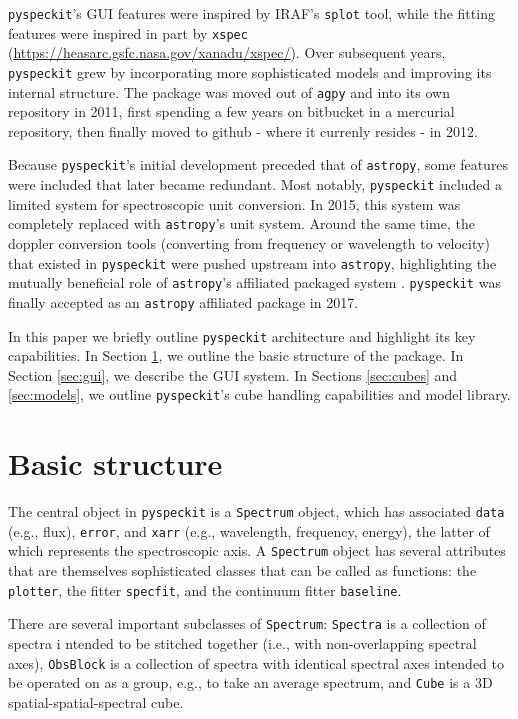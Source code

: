 \documentclass[twocolumn]{aastex62}
\newcommand{\pyspeckit}{\texttt{pyspeckit}\xspace}
\newcommand{\astropy}{\texttt{astropy}\xspace}
\begin{document}
\pyspeckit's GUI features were inspired by IRAF's \texttt{splot} tool, while
the fitting features were inspired in part by \texttt{xspec}
(\url{https://heasarc.gsfc.nasa.gov/xanadu/xspec/}).  Over subsequent years,
\pyspeckit grew by incorporating more sophisticated models and improving its
internal structure.  
The package was moved out of \texttt{agpy} and into its
own repository in 2011, first spending a few years on bitbucket in a mercurial
repository, then finally moved to github - where it currenly resides - in 2012.

Because \pyspeckit's initial development preceded that of \astropy, some features
were included that later became redundant.  Most notably, \pyspeckit included
a limited system for spectroscopic unit conversion.  In 2015, this system
was completely replaced with \astropy's unit system.  Around the same time,
the doppler conversion tools (converting from frequency or wavelength to 
velocity) that existed in \pyspeckit were pushed upstream into \astropy,
highlighting the mutually beneficial role of \astropy's affiliated
packaged system \citep{Price-Whelan2018a}.  \pyspeckit was finally
accepted as an \astropy affiliated package in 2017.


In this paper we briefly outline \texttt{pyspeckit} architecture and highlight
its key capabilities. In Section \ref{sec:basicstructure}, we  outline the
basic structure of the package.  In Section \ref{sec:gui}, we describe the GUI
system.  In Sections \ref{sec:cubes} and \ref{sec:models}, we outline
\pyspeckit's cube handling capabilities and model library. 



\section{Basic structure}
\label{sec:basicstructure}
The central object in \pyspeckit is a \texttt{Spectrum} object, which has
associated \texttt{data} (e.g., flux), \texttt{error}, and \texttt{xarr} (e.g., wavelength,
frequency, energy), the latter of
which represents the spectroscopic axis.  A \texttt{Spectrum} object has
several attributes that are themselves sophisticated classes that can be called
as functions: the \texttt{plotter}, the fitter \texttt{specfit}, and the
continuum fitter \texttt{baseline}.

There are several important subclasses of \texttt{Spectrum}: \texttt{Spectra}
is a collection of spectra i ntended to be stitched together (i.e., with
non-overlapping spectral axes), \texttt{ObsBlock} is a collection of spectra
with identical spectral axes intended to be operated on as a group, e.g., to
take an average spectrum, and \texttt{Cube} is a 3D spatial-spatial-spectral
cube.
\end{document}
